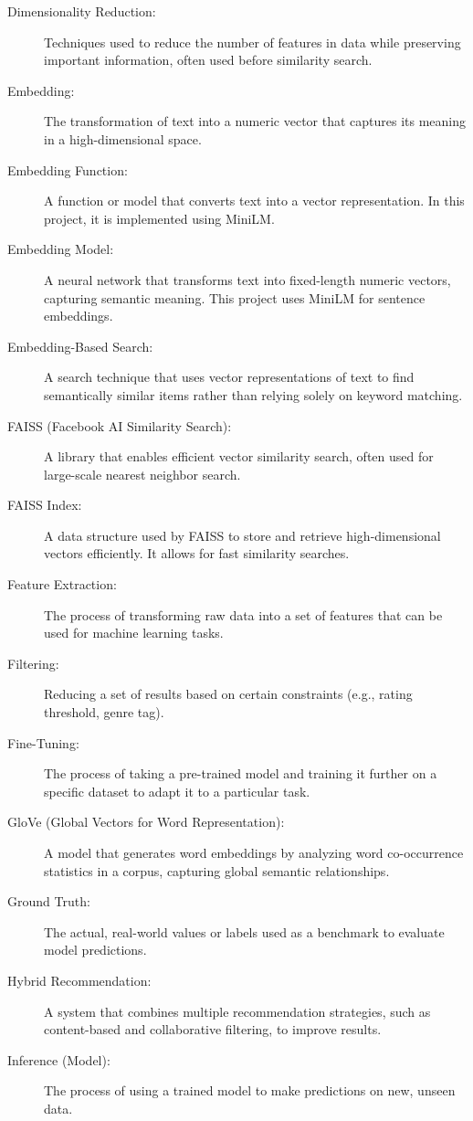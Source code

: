 \begin{description}
    \item[Dimensionality Reduction:] Techniques used to reduce the number of features in data while preserving important information, often used before similarity search.
    \item[Embedding:] The transformation of text into a numeric vector that captures its meaning in a high-dimensional space.
    \item[Embedding Function:] A function or model that converts text into a vector representation. In this project, it is implemented using MiniLM.
    \item[Embedding Model:] A neural network that transforms text into fixed-length numeric vectors, capturing semantic meaning. This project uses MiniLM for sentence embeddings.
    \item[Embedding-Based Search:] A search technique that uses vector representations of text to find semantically similar items rather than relying solely on keyword matching.
    \item[FAISS (Facebook AI Similarity Search):] A library that enables efficient vector similarity search, often used for large-scale nearest neighbor search.
    \item[FAISS Index:] A data structure used by FAISS to store and retrieve high-dimensional vectors efficiently. It allows for fast similarity searches.
    \item[Feature Extraction:] The process of transforming raw data into a set of features that can be used for machine learning tasks.
    \item[Filtering:] Reducing a set of results based on certain constraints (e.g., rating threshold, genre tag).
    \item[Fine-Tuning:] The process of taking a pre-trained model and training it further on a specific dataset to adapt it to a particular task.
    \item[GloVe (Global Vectors for Word Representation):] A model that generates word embeddings by analyzing word co-occurrence statistics in a corpus, capturing global semantic relationships.
    \item[Ground Truth:] The actual, real-world values or labels used as a benchmark to evaluate model predictions.
    \item[Hybrid Recommendation:] A system that combines multiple recommendation strategies, such as content-based and collaborative filtering, to improve results.
    \item[Inference (Model):] The process of using a trained model to make predictions on new, unseen data.

\end{description}

